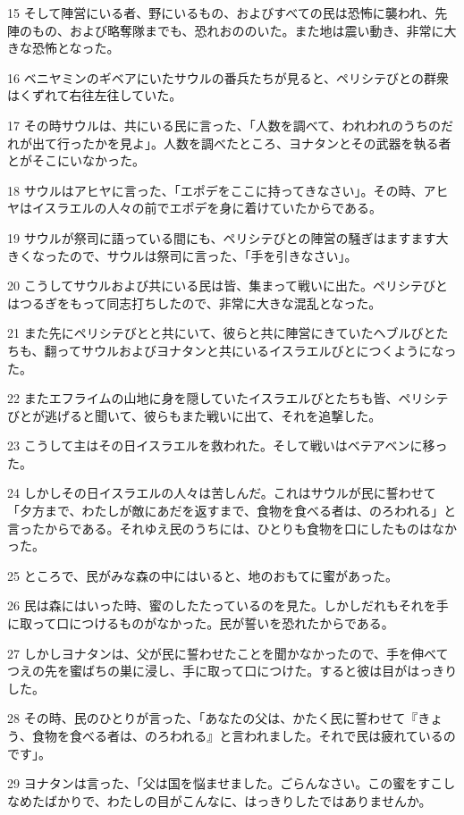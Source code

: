 \par 15 そして陣営にいる者、野にいるもの、およびすべての民は恐怖に襲われ、先陣のもの、および略奪隊までも、恐れおののいた。また地は震い動き、非常に大きな恐怖となった。
\par 16 ベニヤミンのギベアにいたサウルの番兵たちが見ると、ペリシテびとの群衆はくずれて右往左往していた。
\par 17 その時サウルは、共にいる民に言った、「人数を調べて、われわれのうちのだれが出て行ったかを見よ」。人数を調べたところ、ヨナタンとその武器を執る者とがそこにいなかった。
\par 18 サウルはアヒヤに言った、「エポデをここに持ってきなさい」。その時、アヒヤはイスラエルの人々の前でエポデを身に着けていたからである。
\par 19 サウルが祭司に語っている間にも、ペリシテびとの陣営の騒ぎはますます大きくなったので、サウルは祭司に言った、「手を引きなさい」。
\par 20 こうしてサウルおよび共にいる民は皆、集まって戦いに出た。ペリシテびとはつるぎをもって同志打ちしたので、非常に大きな混乱となった。
\par 21 また先にペリシテびとと共にいて、彼らと共に陣営にきていたヘブルびとたちも、翻ってサウルおよびヨナタンと共にいるイスラエルびとにつくようになった。
\par 22 またエフライムの山地に身を隠していたイスラエルびとたちも皆、ペリシテびとが逃げると聞いて、彼らもまた戦いに出て、それを追撃した。
\par 23 こうして主はその日イスラエルを救われた。そして戦いはベテアベンに移った。
\par 24 しかしその日イスラエルの人々は苦しんだ。これはサウルが民に誓わせて「夕方まで、わたしが敵にあだを返すまで、食物を食べる者は、のろわれる」と言ったからである。それゆえ民のうちには、ひとりも食物を口にしたものはなかった。
\par 25 ところで、民がみな森の中にはいると、地のおもてに蜜があった。
\par 26 民は森にはいった時、蜜のしたたっているのを見た。しかしだれもそれを手に取って口につけるものがなかった。民が誓いを恐れたからである。
\par 27 しかしヨナタンは、父が民に誓わせたことを聞かなかったので、手を伸べてつえの先を蜜ばちの巣に浸し、手に取って口につけた。すると彼は目がはっきりした。
\par 28 その時、民のひとりが言った、「あなたの父は、かたく民に誓わせて『きょう、食物を食べる者は、のろわれる』と言われました。それで民は疲れているのです」。
\par 29 ヨナタンは言った、「父は国を悩ませました。ごらんなさい。この蜜をすこしなめたばかりで、わたしの目がこんなに、はっきりしたではありませんか。
